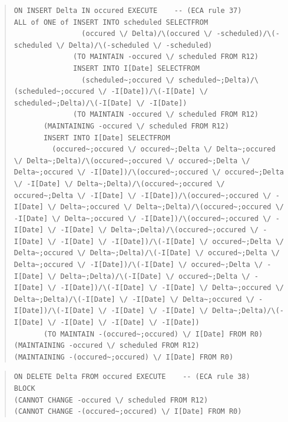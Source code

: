 \documentclass[10pt,a4paper]{report}              %
\theoremstyle{plain}\theorembodyfont{\rmfamily}\newtheorem{definition}{Definition}[section]
\theoremstyle{plain}\theorembodyfont{\rmfamily}\newtheorem{designrule}[definition]{Requirement}
\begin{document}
\begin{quote}
\begin{verbatim}
ON INSERT Delta IN occured EXECUTE    -- (ECA rule 37)
ALL of ONE of INSERT INTO scheduled SELECTFROM
                (occured \/ Delta)/\(occured \/ -scheduled)/\(-scheduled \/ Delta)/\(-scheduled \/ -scheduled)
              (TO MAINTAIN -occured \/ scheduled FROM R12)
              INSERT INTO I[Date] SELECTFROM
                (scheduled~;occured \/ scheduled~;Delta)/\(scheduled~;occured \/ -I[Date])/\(-I[Date] \/ scheduled~;Delta)/\(-I[Date] \/ -I[Date])
              (TO MAINTAIN -occured \/ scheduled FROM R12)
       (MAINTAINING -occured \/ scheduled FROM R12)
       INSERT INTO I[Date] SELECTFROM
         (occured~;occured \/ occured~;Delta \/ Delta~;occured \/ Delta~;Delta)/\(occured~;occured \/ occured~;Delta \/ Delta~;occured \/ -I[Date])/\(occured~;occured \/ occured~;Delta \/ -I[Date] \/ Delta~;Delta)/\(occured~;occured \/ occured~;Delta \/ -I[Date] \/ -I[Date])/\(occured~;occured \/ -I[Date] \/ Delta~;occured \/ Delta~;Delta)/\(occured~;occured \/ -I[Date] \/ Delta~;occured \/ -I[Date])/\(occured~;occured \/ -I[Date] \/ -I[Date] \/ Delta~;Delta)/\(occured~;occured \/ -I[Date] \/ -I[Date] \/ -I[Date])/\(-I[Date] \/ occured~;Delta \/ Delta~;occured \/ Delta~;Delta)/\(-I[Date] \/ occured~;Delta \/ Delta~;occured \/ -I[Date])/\(-I[Date] \/ occured~;Delta \/ -I[Date] \/ Delta~;Delta)/\(-I[Date] \/ occured~;Delta \/ -I[Date] \/ -I[Date])/\(-I[Date] \/ -I[Date] \/ Delta~;occured \/ Delta~;Delta)/\(-I[Date] \/ -I[Date] \/ Delta~;occured \/ -I[Date])/\(-I[Date] \/ -I[Date] \/ -I[Date] \/ Delta~;Delta)/\(-I[Date] \/ -I[Date] \/ -I[Date] \/ -I[Date])
       (TO MAINTAIN -(occured~;occured) \/ I[Date] FROM R0)
(MAINTAINING -occured \/ scheduled FROM R12)
(MAINTAINING -(occured~;occured) \/ I[Date] FROM R0)
\end{verbatim}
\end{quote}
\begin{quote}
\begin{verbatim}
ON DELETE Delta FROM occured EXECUTE    -- (ECA rule 38)
BLOCK
(CANNOT CHANGE -occured \/ scheduled FROM R12)
(CANNOT CHANGE -(occured~;occured) \/ I[Date] FROM R0)
\end{verbatim}
\end{quote}
\end{document}
